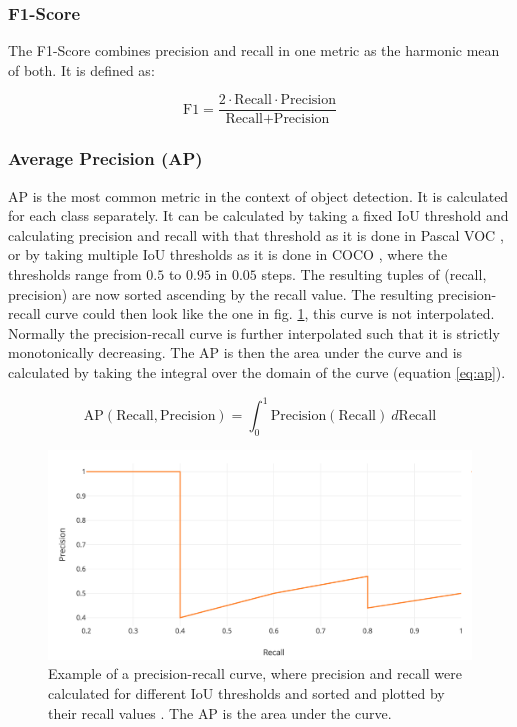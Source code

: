 \subsubsection{F1-Score}

The F1-Score combines precision and recall in one metric as the harmonic mean of both.
It is defined as:

\begin{equation}
    \text{F1} = \frac{2 \cdot \text{Recall} \cdot \text{Precision}}{\text{Recall} + \text{Precision}}
\end{equation}

\subsubsection{Average Precision (AP)}

\ac{AP} is the most common metric in the context of object detection. It is calculated for each class separately.
It can be calculated by taking a fixed \ac{IoU} threshold and calculating precision and recall with that threshold as it is done in Pascal VOC \cite{map_pascal_voc}, or by taking multiple \ac{IoU} thresholds as it is done in COCO \cite{map_coco}, where the thresholds range from $0.5$ to $0.95$ in $0.05$ steps.
The resulting tuples of (recall, precision) are now sorted ascending by the recall value.
The resulting precision-recall curve could then look like the one in fig. \ref{fig:pr_curve}, this curve is not interpolated.
Normally the precision-recall curve is further interpolated such that it is strictly monotonically decreasing.
The \ac{AP} is then the area under the curve and is calculated
by taking the integral over the domain of the curve (equation \ref{eq:ap}).

\begin{equation}
    \text{AP}(\text{Recall}, \text{Precision}) = \int_0^1 \text{Precision}(\text{Recall})\ d\text{Recall}
    \label{eq:ap}
\end{equation}

\begin{figure}
\begin{center}
    \includegraphics[width=\columnwidth]{imgs/pr_curve.png}
    \caption{Example of a precision-recall curve, where precision and recall were calculated for different \ac{IoU} thresholds and sorted and plotted by their recall values \cite{map_article}. The \ac{AP} is the area under the curve.}
    \label{fig:pr_curve}
\end{center}
\end{figure}

